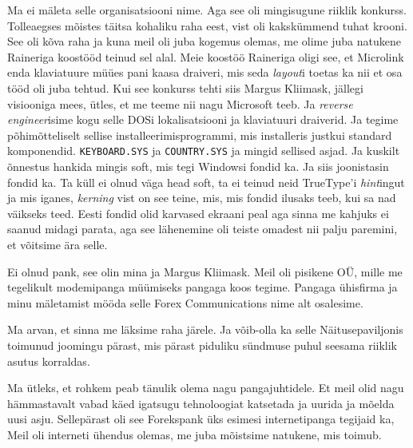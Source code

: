 
Ma ei mäleta selle organisatsiooni nime. Aga  see oli mingisugune riiklik 
konkurss. Tolleaegses mõistes täitsa kohaliku raha eest, vist oli kakskümmend 
tuhat krooni. See oli kõva raha ja kuna meil oli juba kogemus olemas, me olime 
juba natukene Raineriga koostööd teinud sel alal. Meie koostöö Raineriga oligi 
see, et Microlink enda klaviatuure müües pani kaasa draiveri, mis seda 
\emph{layout}i  toetas ka nii et osa tööd oli juba tehtud. Kui see konkurss 
tehti siis Margus Kliimask, jällegi visiooniga 
mees, ütles, et me teeme nii nagu Microsoft teeb. Ja \emph{reverse 
engineer}isime  kogu selle DOSi lokalisatsiooni ja klaviatuuri draiverid. Ja 
tegime põhimõtteliselt sellise installeerimisprogrammi, mis installeris justkui 
standard komponendid.  \verb|KEYBOARD.SYS| ja \verb|COUNTRY.SYS| ja mingid 
sellised asjad. Ja kuskilt õnnestus hankida mingis soft, mis tegi Windowsi 
fondid ka. Ja siis joonistasin fondid ka. Ta küll ei olnud väga head soft, ta 
ei teinud neid TrueType'i \emph{hint}ingut ja mis iganes, \emph{kerning} vist 
on see teine, mis, mis fondid ilusaks teeb, kui sa nad väikseks teed. Eesti 
fondid olid karvased ekraani peal aga sinna me kahjuks ei saanud midagi parata, 
aga  see lähenemine oli teiste omadest nii palju paremini, et võitsime ära 
selle.


Ei olnud pank, see olin mina ja Margus Kliimask. 
Meil oli pisikene OÜ, mille me tegelikult modemipanga müümiseks pangaga koos 
tegime. Pangaga ühisfirma ja minu mäletamist mööda selle Forex Communications 
nime alt osalesime. 


Ma arvan, et sinna me läksime raha järele. Ja võib-olla ka selle 
Näitusepaviljonis toimunud joomingu pärast, mis pärast piduliku sündmuse puhul 
seesama riiklik asutus korraldas.


Ma ütleks, et  rohkem peab tänulik olema nagu pangajuhtidele. Et meil olid nagu 
hämmastavalt vabad käed igatsugu tehnoloogiat katsetada ja uurida ja mõelda 
uusi asju. Sellepärast oli see Forekspank  üks esimesi internetipanga tegijaid 
ka, Meil oli interneti ühendus olemas, me juba mõistsime natukene, mis toimub. 

